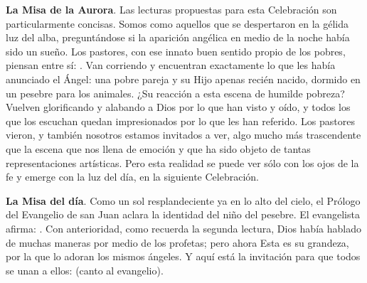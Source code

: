 \textbf{La Misa de la Aurora}. Las lecturas propuestas para esta Celebración son particularmente concisas. Somos como aquellos que se despertaron en la gélida luz del alba, preguntándose si la aparición angélica en medio de la noche había sido un sueño. Los pastores, con ese innato buen sentido propio de los pobres, piensan entre sí: . Van corriendo y encuentran exactamente lo que les había anunciado el Ángel: una pobre pareja y su Hijo apenas recién nacido, dormido en un pesebre para los animales. ¿Su reacción a esta escena de humilde pobreza? Vuelven glorificando y alabando a Dios por lo que han visto y oído, y todos los que los escuchan quedan impresionados por lo que les han referido. Los pastores vieron, y también nosotros estamos invitados a ver, algo mucho más trascendente que la escena que nos llena de emoción y que ha sido objeto de tantas representaciones artísticas. Pero esta realidad se puede ver sólo con los ojos de la fe y emerge con la luz del día, en la siguiente Celebración.

\textbf{La Misa del día}. Como un sol resplandeciente ya en lo alto del cielo, el Prólogo del Evangelio de san Juan aclara la identidad del niño del pesebre. El evangelista afirma: . Con anterioridad, como recuerda la segunda lectura, Dios había hablado de muchas maneras por medio de los profetas; pero ahora  Esta es su grandeza, por la que lo adoran los mismos ángeles. Y aquí está la invitación para que todos se unan a ellos:  (canto al evangelio).


